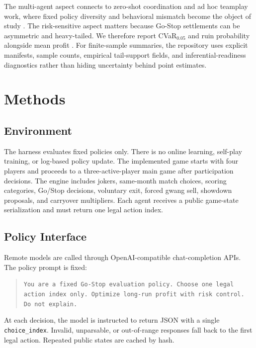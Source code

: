 \documentclass[11pt]{article}
\begin{document}
The multi-agent aspect connects to zero-shot coordination and ad hoc teamplay work, where fixed policy diversity and behavioral mismatch become the object of study \citep{hu2020otherplay, anyplay2022, behavioral2023, fewshot2023}. The risk-sensitive aspect matters because Go-Stop settlements can be asymmetric and heavy-tailed. We therefore report CVaR$_{0.05}$ and ruin probability alongside mean profit \citep{riskbayes2022, rsrlcvar2023}. For finite-sample summaries, the repository uses explicit manifests, sample counts, empirical tail-support fields, and inferential-readiness diagnostics rather than hiding uncertainty behind point estimates.

\section{Methods}
\subsection{Environment}
The harness evaluates fixed policies only. There is no online learning, self-play training, or log-based policy update. The implemented game starts with four players and proceeds to a three-active-player main game after participation decisions. The engine includes jokers, same-month match choices, scoring categories, Go/Stop decisions, voluntary exit, forced gwang sell, showdown proposals, and carryover multipliers. Each agent receives a public game-state serialization and must return one legal action index.

\subsection{Policy Interface}
Remote models are called through OpenAI-compatible chat-completion APIs. The policy prompt is fixed:
\begin{quote}
\small
\texttt{You are a fixed Go-Stop evaluation policy. Choose one legal action index only. Optimize long-run profit with risk control. Do not explain.}
\end{quote}
At each decision, the model is instructed to return JSON with a single \texttt{choice\_index}. Invalid, unparsable, or out-of-range responses fall back to the first legal action. Repeated public states are cached by hash.
\end{document}
